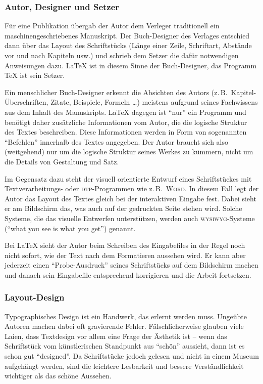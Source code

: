 \subsubsection{Autor, Designer und Setzer}
 
Für eine Publikation übergab der Autor dem Verleger
traditionell  ein maschinengeschriebenes Manuskript.  Der
Buch-Designer des Verlages entschied dann über das Layout des
Schriftstücks (Länge einer Zeile, Schriftart, Abstände vor
und nach Kapiteln usw.\@) und schrieb dem Setzer die
dafür notwendigen Anweisungen dazu.
\LaTeX{} ist in diesem Sinne der Buch-Designer, 
das Programm \TeX{} ist sein Setzer.
 
Ein menschlicher Buch-Designer erkennt die Absichten des Autors
(z.\,B.\ Kapitel-Überschriften, Zitate, Beispiele, Formeln
\dots) meistens aufgrund seines Fachwissens aus dem Inhalt des
Manuskripts.  \LaTeX{} dagegen ist "`nur"' ein Programm und
benötigt daher zusätzliche Informationen vom Autor, die die
logische Struktur des Textes beschreiben.
Diese Informationen werden in Form von sogenannten "`Befehlen"'
innerhalb des Textes angegeben.
Der Autor braucht sich also
(weitgehend) nur um die logische Struktur seines Werkes zu kümmern,
nicht um die Details von Gestaltung und Satz.
 
Im Gegensatz dazu steht der visuell orientierte Entwurf eines
Schriftstückes mit Textverarbeitungs- oder \textsc{dtp}-Programmen wie z.\,B.\ 
\textsc{Word}.
In diesem Fall legt der Autor das Layout des Textes gleich bei der
interaktiven Eingabe fest. Dabei sieht er am Bildschirm das, was
auch auf der gedruckten Seite stehen wird. Solche Systeme, die das
visuelle Entwerfen unterstützen, werden auch \textsc{wysiwyg}-Systeme
("`what you see is what you get"') genannt.
 
Bei \LaTeX{} sieht der Autor beim Schreiben des Eingabefiles in
der Regel noch nicht sofort, wie der Text nach dem Formatieren 
aussehen wird. Er kann aber %
jederzeit einen "`Probe-Ausdruck"' seines Schriftstücks auf dem
Bildschirm machen und danach sein Eingabefile entsprechend 
korrigieren und die Arbeit fortsetzen.
 
 
\subsubsection{Layout-Design}
 
Typographisches Design ist ein Handwerk, das erlernt werden muss.
Ungeübte Autoren machen dabei oft gravierende Fehler.
Fälschlicherweise glauben viele Laien, dass Textdesign
vor allem eine Frage der Ästhetik ist -- wenn das
Schriftstück vom künstlerischen Standpunkt aus "`schön"'
aussieht, dann ist es schon gut "`designed"'.
Da Schriftstücke jedoch gelesen und nicht in einem Museum
aufgehängt werden, sind die leichtere Lesbarkeit und bessere
Verständlichkeit wichtiger als das schöne Aussehen.
 
